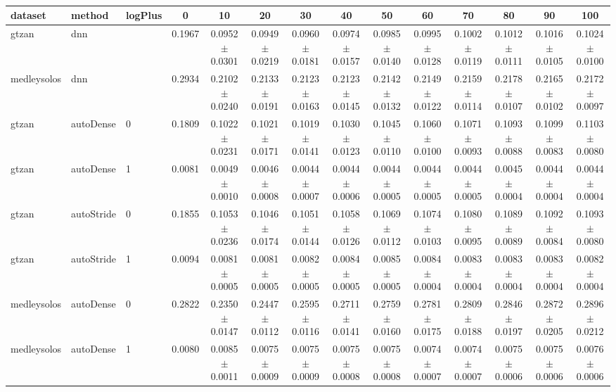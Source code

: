   
\begin{table} 
\begin{center} 
\ 
 \setlength{\tabcolsep}{.16667em} 
\begin{tabular}{lllccccccccccc} 
dataset & method & logPlus &   0 &  10 &  20 &  30 &  40 &  50 &  60 &  70 &  80 &  90 & 100 \\ 
\hline 
gtzan & dnn &  & 0.1967 & 0.0952 $\pm$0.0301 & 0.0949 $\pm$0.0219 & 0.0960 $\pm$0.0181 & 0.0974 $\pm$0.0157 & 0.0985 $\pm$0.0140 & 0.0995 $\pm$0.0128 & 0.1002 $\pm$0.0119 & 0.1012 $\pm$0.0111 & 0.1016 $\pm$0.0105 & 0.1024 $\pm$0.0100 \\ 
medleysolos & dnn &  & 0.2934 & 0.2102 $\pm$0.0240 & 0.2133 $\pm$0.0191 & 0.2123 $\pm$0.0163 & 0.2123 $\pm$0.0145 & 0.2142 $\pm$0.0132 & 0.2149 $\pm$0.0122 & 0.2159 $\pm$0.0114 & 0.2178 $\pm$0.0107 & 0.2165 $\pm$0.0102 & 0.2172 $\pm$0.0097 \\ 
gtzan & autoDense & 0 & 0.1809 & 0.1022 $\pm$0.0231 & 0.1021 $\pm$0.0171 & 0.1019 $\pm$0.0141 & 0.1030 $\pm$0.0123 & 0.1045 $\pm$0.0110 & 0.1060 $\pm$0.0100 & 0.1071 $\pm$0.0093 & 0.1093 $\pm$0.0088 & 0.1099 $\pm$0.0083 & 0.1103 $\pm$0.0080 \\ 
gtzan & autoDense & 1 & 0.0081 & 0.0049 $\pm$0.0010 & 0.0046 $\pm$0.0008 & 0.0044 $\pm$0.0007 & 0.0044 $\pm$0.0006 & 0.0044 $\pm$0.0005 & 0.0044 $\pm$0.0005 & 0.0044 $\pm$0.0005 & 0.0045 $\pm$0.0004 & 0.0044 $\pm$0.0004 & 0.0044 $\pm$0.0004 \\ 
gtzan & autoStride & 0 & 0.1855 & 0.1053 $\pm$0.0236 & 0.1046 $\pm$0.0174 & 0.1051 $\pm$0.0144 & 0.1058 $\pm$0.0126 & 0.1069 $\pm$0.0112 & 0.1074 $\pm$0.0103 & 0.1080 $\pm$0.0095 & 0.1089 $\pm$0.0089 & 0.1092 $\pm$0.0084 & 0.1093 $\pm$0.0080 \\ 
gtzan & autoStride & 1 & 0.0094 & 0.0081 $\pm$0.0005 & 0.0081 $\pm$0.0005 & 0.0082 $\pm$0.0005 & 0.0084 $\pm$0.0005 & 0.0085 $\pm$0.0005 & 0.0084 $\pm$0.0004 & 0.0083 $\pm$0.0004 & 0.0083 $\pm$0.0004 & 0.0083 $\pm$0.0004 & 0.0082 $\pm$0.0004 \\ 
medleysolos & autoDense & 0 & 0.2822 & 0.2350 $\pm$0.0147 & 0.2447 $\pm$0.0112 & 0.2595 $\pm$0.0116 & 0.2711 $\pm$0.0141 & 0.2759 $\pm$0.0160 & 0.2781 $\pm$0.0175 & 0.2809 $\pm$0.0188 & 0.2846 $\pm$0.0197 & 0.2872 $\pm$0.0205 & 0.2896 $\pm$0.0212 \\ 
medleysolos & autoDense & 1 & 0.0080 & 0.0085 $\pm$0.0011 & 0.0075 $\pm$0.0009 & 0.0075 $\pm$0.0009 & 0.0075 $\pm$0.0008 & 0.0075 $\pm$0.0008 & 0.0074 $\pm$0.0007 & 0.0074 $\pm$0.0007 & 0.0075 $\pm$0.0006 & 0.0075 $\pm$0.0006 & 0.0076 $\pm$0.0006 \\ 

\end{tabular}
\end{center}
\end{table}

